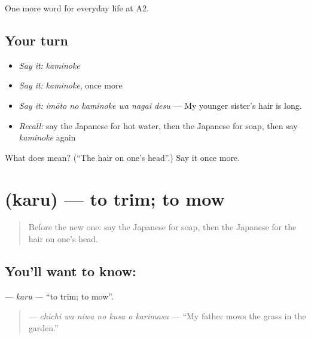 \begin{grammarlens}[title={What you've built}]
One more word for everyday life at A2.
\end{grammarlens}

\subsection*{Your turn}
\begin{itemize}
\raggedright
  \item \emph{Say it:} \emph{kaminoke}
  \item \emph{Say it:} \emph{kaminoke}, once more
  \item \emph{Say it:} \emph{imōto no kaminoke wa nagai desu} — My younger sister's hair is long.
  \item \emph{Recall:} say the Japanese for hot water, then the Japanese for soap, then say \emph{kaminoke} again
\end{itemize}

\begin{tcolorbox}[breakable,colback=teal!4,colframe=teal!35!black,title={Before you move on}]
What does  mean? (\textquotedblleft{}The hair on one's head\textquotedblright{}.) Say it once more.
\end{tcolorbox}
\section[\texorpdfstring{\ja{かる} (karu)}{かる (karu)}]{ (karu) — to trim; to mow}

\label{lesson:JA-C148-karu}



\begin{quote}
Before the new one: say the Japanese for soap, then the Japanese for the hair on one's head.
\end{quote}

\subsection*{You'll want to know: }
\textbf{} — \emph{karu} — \textquotedblleft{}to trim; to mow\textquotedblright{}.

\begin{quote}
\textbf{   } — \emph{chichi wa niwa no kusa o karimasu} — \textquotedblleft{}My father mows the grass in the garden.\textquotedblright{}
\end{quote}

